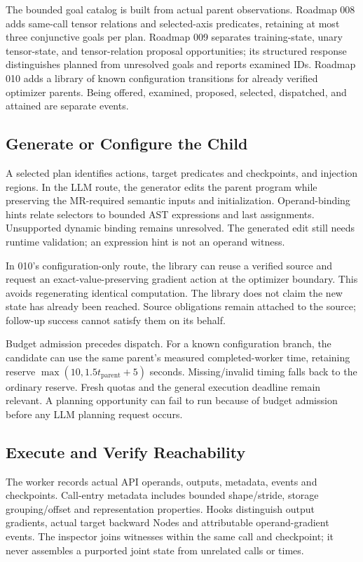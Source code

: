 \documentclass[conference]{IEEEtran}
\begin{document}
The bounded goal catalog is built from actual parent observations. Roadmap 008 adds same-call tensor relations and selected-axis predicates, retaining at most three conjunctive goals per plan. Roadmap 009 separates training-state, unary tensor-state, and tensor-relation proposal opportunities; its structured response distinguishes planned from unresolved goals and reports examined IDs. Roadmap 010 adds a library of known configuration transitions for already verified optimizer parents. Being offered, examined, proposed, selected, dispatched, and attained are separate events.

\subsection{Generate or Configure the Child}
A selected plan identifies actions, target predicates and checkpoints, and injection regions. In the LLM route, the generator edits the parent program while preserving the MR-required semantic inputs and initialization. Operand-binding hints relate selectors to bounded AST expressions and last assignments. Unsupported dynamic binding remains unresolved. The generated edit still needs runtime validation; an expression hint is not an operand witness.

In 010's configuration-only route, the library can reuse a verified source and request an exact-value-preserving gradient action at the optimizer boundary. This avoids regenerating identical computation. The library does not claim the new state has already been reached. Source obligations remain attached to the source; follow-up success cannot satisfy them on its behalf.

Budget admission precedes dispatch. For a known configuration branch, the candidate can use the same parent's measured completed-worker time, retaining reserve $\max(10,1.5t_{\mathrm{parent}}+5)$ seconds. Missing/invalid timing falls back to the ordinary reserve. Fresh quotas and the general execution deadline remain relevant. A planning opportunity can fail to run because of budget admission before any LLM planning request occurs.

\subsection{Execute and Verify Reachability}
The worker records actual API operands, outputs, metadata, events and checkpoints. Call-entry metadata includes bounded shape/stride, storage grouping/offset and representation properties. Hooks distinguish output gradients, actual target backward Nodes and attributable operand-gradient events. The inspector joins witnesses within the same call and checkpoint; it never assembles a purported joint state from unrelated calls or times.
\end{document}
